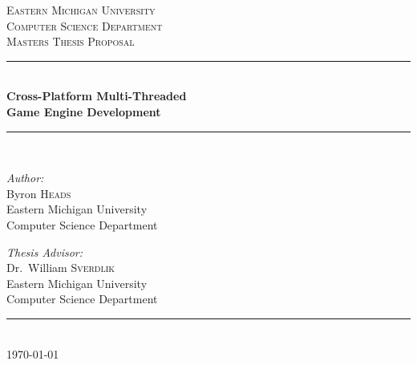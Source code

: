 \documentclass[12pt,a4paper,oneside]{article}
\newcommand{\HRule}{\rule{\linewidth}{0.5mm}}
\begin{document}
\begin{titlepage}
    \begin{center}
        \textsc{\large Eastern Michigan University}\\[1.5cm]
        \textsc{\large Computer Science Department}\\
        \textsc{\large Masters Thesis Proposal}\\[0.5cm]
        \HRule\\[0.4cm]
        { \huge \bfseries Cross-Platform Multi-Threaded \\
            Game Engine Development }\\[0.4cm]
        \HRule\\[1.5cm]

        \begin{minipage}{0.45\textwidth}
            \begin{flushleft} \large
                \emph{Author:}\\
                Byron \textsc{Heads} \\
                \small Eastern Michigan University\\
                \small Computer Science Department \\
            \end{flushleft}
        \end{minipage}
        \begin{minipage}{0.45\textwidth}
            \begin{flushright} \large
                \emph{Thesis Advisor:} \\
                Dr.~William \textsc{Sverdlik}\\
                \small Eastern Michigan University\\
                \small Computer Science Department
            \end{flushright}
        \end{minipage}

        \vfill
    
        \HRule\\[0.5cm]
        { \large \today }
    \end{center}
\end{titlepage}
\end{document}
